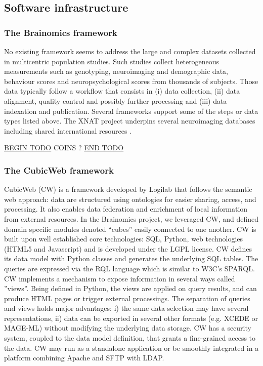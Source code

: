 \documentclass[review]{elsarticle}
\begin{document}
\subsection{Software infrastructure}

\subsubsection{The Brainomics framework}

No existing framework seems to address the large and complex datasets collected in multicentric population studies. Such studies collect heterogeneous measurements such as genotyping, neuroimaging and demographic data, behaviour scores and neuropsychological scores from thousands of subjects. Those data typically
follow a workflow that consists in (i) data collection, (ii) data alignment, quality control and possibly further processing and (iii) data indexation and publication. Several frameworks support some of the steps or data types listed above. The XNAT project \cite{XNAT2007} underpins several neuroimaging databases including shared international resources \cite{HBP2012}.

\underline{BEGIN TODO}
COINS ?
\underline{END TODO}


\subsubsection{The CubicWeb framework} CubicWeb (CW) is a framework developed by Logilab that follows the semantic web approach: data are structured using ontologies for easier sharing, access, and processing. It also enables data federation and enrichment of local information from external resources. In the Brainomics project, we leveraged CW, and defined domain specific modules denoted ``cubes'' easily connected to one another. CW is built upon well established core technologies: SQL, Python, web technologies (HTML5 and Javascript) and is developed under the LGPL license. CW defines its data model with Python classes and generates the underlying SQL tables. The queries are expressed via the RQL language which is similar to W3C’s
SPARQL. CW implements a mechanism to expose information in several ways called ”views”. Being defined in Python, the views are applied on query results, and can produce HTML pages or trigger external processings. The separation of queries and views holds major advantages: i) the same data selection may have several representations, ii) data can be exported in several other formats (e.g. XCEDE or MAGE-ML) without modifying the underlying data storage. CW has a security system, coupled to the data model definition, that grants a fine-grained access to the data. CW may run as a standalone application or be smoothly integrated in a platform combining Apache and SFTP with LDAP.
\end{document}
